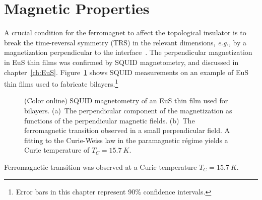 \section{Magnetic Properties}\label{sec:bl2014_mag}
A crucial condition for the ferromagnet to affect the topological insulator is to break the time-reversal symmetry (TRS) in the relevant dimensions, \textit{e.g.,} by a magnetization perpendicular to the interface~\cite{TI_Col, QAH_TI_Yu, MnSe}. The perpendicular magnetization in EuS thin films was confirmed by SQUID magnetometry, and discussed in chapter~\ref{ch:EuS}. Figure~\ref{fig:bl2014_squid} shows SQUID measurements on an example of EuS thin films used to fabricate bilayers.\footnote{Error bars in this chapter represent 90\% confidence intervals.}%
%
\begin{figure}[ht]%
    \centering%
    \caption[SQUID magnetometry of an EuS thin film used for bilayers]{\label{fig:bl2014_squid}(Color online) SQUID magnetometry of an EuS thin film used for bilayers. (a)~The perpendicular component of the magnetization as functions of the perpendicular magnetic fields. (b)~The ferromagnetic transition observed in a small perpendicular field. A fitting to the Curie-Weiss law in the paramagnetic r\'egime yields a Curie temperature of $T_C = \SI{15.7}{K}$.}%
\end{figure} %
%
Ferromagnetic transition was observed at a Curie temperature $T_C = \SI{15.7}{K}$.

